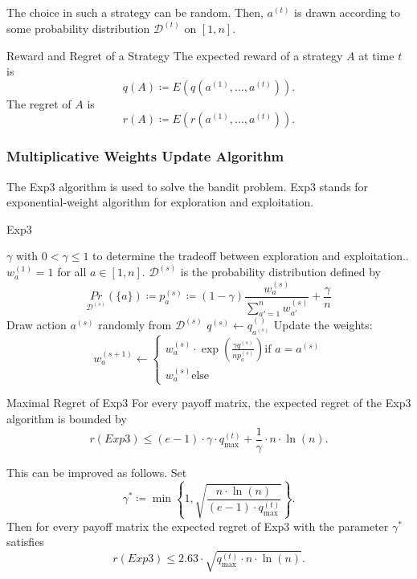 \documentclass[english]{panikzettel}
\begin{document}
The choice in such a strategy can be random. Then, $a^{(t)}$ is drawn according to some probability distribution $\mathcal{D}^{(t)}$ on $[1,n]$.

\begin{defi}{Reward and Regret of a Strategy}
The expected reward of a strategy $A$ at time $t$ is
\[
q(A)\coloneqq E(q(a^{(1)},...,a^{(t)})).
\]
The regret of $A$ is
\[
r(A)\coloneqq E(r(a^{(1)},...,a^{(t)})).
\]
\end{defi}

\subsubsection{Multiplicative Weights Update Algorithm}
The Exp3 algorithm is used to solve the bandit problem. Exp3 stands for exponential-weight algorithm for exploration and exploitation.

\begin{halfboxl}
\vspace{-\baselineskip}
\begin{algo}{Exp3}
{
\renewcommand{\algorithmicrequire}{\textbf{Parameter:}}
\renewcommand{\algorithmicensure}{\textbf{Initialization:}}
\begin{algorithmic}[1]
 \Require $\gamma$ with $0<\gamma\leq 1$ to determine the tradeoff between exploration and exploitation..
 \Ensure $w_a^{(1)}=1$ for all $a\in[1,n]$.
   \State $\mathcal{D}^{(s)}$ is the probability distribution defined by
   \[
   \underset{\mathcal{D}^{(s)}}{Pr}(\{a\})\coloneqq p_a^{(s)}\coloneqq (1-\gamma)\frac{w_a^{(s)}}{\sum_{a'=1}^n w_{a'}^{(s)}}+\frac{\gamma}{n}
   \]
   \State Draw action $a^{(s)}$ randomly from $\mathcal{D}^{(s)}$
   \State $q^{(s)}\leftarrow q_{a^{(s)}}^{()}$ 
   \State Update the weights:
   \[
   w_a^{(s+1)}\leftarrow
   \begin{cases}
     w_a^{(s)}\cdot \exp(\frac{\gamma q^{(s)}}{n p_a^{(s)}}) \text{if } a=a^{(s)}\\
     w_a^{(s)} \text{else}
   \end{cases}
   \]
 \EndFor
\end{algorithmic}
}
\end{algo}

\end{halfboxl}
\begin{halfboxr}
\vspace{-\baselineskip}
\begin{theo}{Maximal Regret of Exp3}
For every payoff matrix, the expected regret of the Exp3 algorithm is bounded by
\[
r(Exp3)\leq(e-1)\cdot \gamma\cdot q_{\max}^{(t)}+\frac{1}{\gamma}\cdot n \cdot \ln(n).
\]

This can be improved as follows. Set
\[
\gamma^*\coloneqq \min \left\lbrace 1, \sqrt{\frac{n\cdot \ln(n)}{(e-1)\cdot q_{\max}^{(t)}} } \right\rbrace.
\]
Then for every payoff matrix the expected regret of Exp3 with the parameter $\gamma^*$ satisfies
\[
r(Exp3)\leq 2.63 \cdot \sqrt{q_{\max}^{(t)}\cdot n \cdot \ln(n)}.
\]
\end{theo}
\end{halfboxr}
\end{document}
